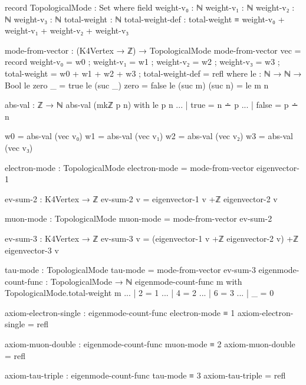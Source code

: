 \documentclass[11pt,a4paper]{book}
\begin{document}
\begin{code}
record TopologicalMode : Set where
  field
    weight-v₀ : ℕ
    weight-v₁ : ℕ
    weight-v₂ : ℕ
    weight-v₃ : ℕ
    total-weight : ℕ
    total-weight-def : total-weight ≡ 
      weight-v₀ + weight-v₁ + weight-v₂ + weight-v₃

mode-from-vector : (K4Vertex → ℤ) → TopologicalMode
mode-from-vector vec = 
  record
    { weight-v₀ = w0
    ; weight-v₁ = w1
    ; weight-v₂ = w2
    ; weight-v₃ = w3
    ; total-weight = w0 + w1 + w2 + w3
    ; total-weight-def = refl
    }
  where
    le : ℕ → ℕ → Bool
    le zero _ = true
    le (suc _) zero = false
    le (suc m) (suc n) = le m n

    abs-val : ℤ → ℕ
    abs-val (mkℤ p n) with le p n
    ... | true  = n ∸ p
    ... | false = p ∸ n

    w0 = abs-val (vec v₀)
    w1 = abs-val (vec v₁)
    w2 = abs-val (vec v₂)
    w3 = abs-val (vec v₃)

electron-mode : TopologicalMode
electron-mode = mode-from-vector eigenvector-1

ev-sum-2 : K4Vertex → ℤ
ev-sum-2 v = eigenvector-1 v +ℤ eigenvector-2 v

muon-mode : TopologicalMode
muon-mode = mode-from-vector ev-sum-2

ev-sum-3 : K4Vertex → ℤ
ev-sum-3 v = (eigenvector-1 v +ℤ eigenvector-2 v) +ℤ eigenvector-3 v

tau-mode : TopologicalMode
tau-mode = mode-from-vector ev-sum-3
eigenmode-count-func : TopologicalMode → ℕ
eigenmode-count-func m with TopologicalMode.total-weight m
... | 2 = 1
... | 4 = 2
... | 6 = 3
... | _ = 0

axiom-electron-single : eigenmode-count-func electron-mode ≡ 1
axiom-electron-single = refl

axiom-muon-double : eigenmode-count-func muon-mode ≡ 2
axiom-muon-double = refl

axiom-tau-triple : eigenmode-count-func tau-mode ≡ 3
axiom-tau-triple = refl

\end{code}
\end{document}

